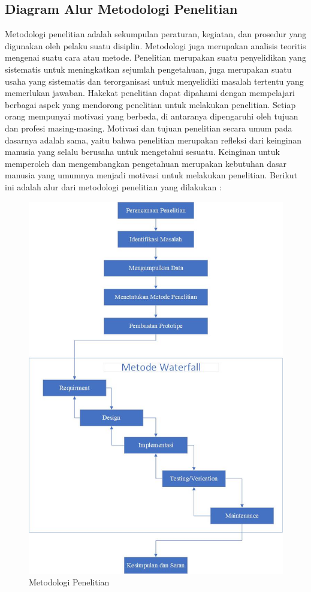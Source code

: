 \subsection{Diagram Alur Metodologi Penelitian}
\par Metodologi penelitian adalah sekumpulan peraturan, kegiatan, dan prosedur yang digunakan oleh pelaku suatu disiplin. Metodologi juga merupakan analisis teoritis mengenai suatu cara atau metode. Penelitian merupakan suatu penyelidikan yang sistematis untuk meningkatkan sejumlah pengetahuan, juga merupakan suatu usaha yang sistematis dan terorganisasi untuk menyelidiki masalah tertentu yang memerlukan jawaban. Hakekat penelitian dapat dipahami dengan mempelajari berbagai aspek yang mendorong penelitian untuk melakukan penelitian. Setiap orang mempunyai motivasi yang berbeda, di antaranya dipengaruhi oleh tujuan dan profesi masing-masing. Motivasi dan tujuan penelitian secara umum pada dasarnya adalah sama, yaitu bahwa penelitian merupakan refleksi dari keinginan manusia yang selalu berusaha untuk mengetahui sesuatu. Keinginan untuk memperoleh dan mengembangkan pengetahuan merupakan kebutuhan dasar manusia yang umumnya menjadi motivasi untuk melakukan penelitian. Berikut ini adalah alur dari metodologi penelitian yang dilakukan : 
\begin{figure}[H]
\centering
\includegraphics[width=1\textwidth]{figures/metodo.jpg}
\caption{Metodologi Penelitian}
\label{print}
\end{figure}

